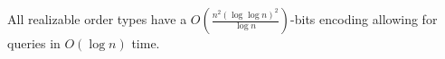 \begin{contribution}[%
  name={
    \(o(n^2)\)-bits
    \(O(\log n)\)-querytime
    encodings for realizable OT
  },%
  label=thm:realizable,%
  restate=TheoremGPTRealizable%
]
  All realizable order types have
  a
  \(O(\frac{n^2 {(\log \log n)}^2}{\log n})\)-bits
  encoding
  allowing for queries in \(O(\log n)\) time.
\end{contribution}
